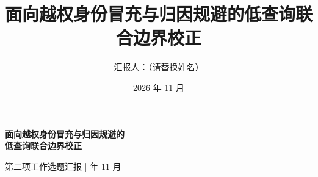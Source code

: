\documentclass[xcolor=table,dvipsnames,svgnames,aspectratio=169]{ctexbeamer}
\author[]{汇报人：（请替换姓名）}
\institute[]{南昌大学}
\date{2026 年 11 月}
\title[低查询联合边界校正]{面向越权身份冒充与归因规避的低查询联合边界校正}
\begin{document}

\begin{frame}
  \vfill
  \centering
  {\Large\bfseries 面向越权身份冒充与归因规避的\\[0.25em]
   低查询联合边界校正\par}
  \vspace{0.6em}
  \vfill
  第二项工作选题汇报 \;| 年 11 月\par
  \vfill
\end{frame}



\makebottom
\end{document}
